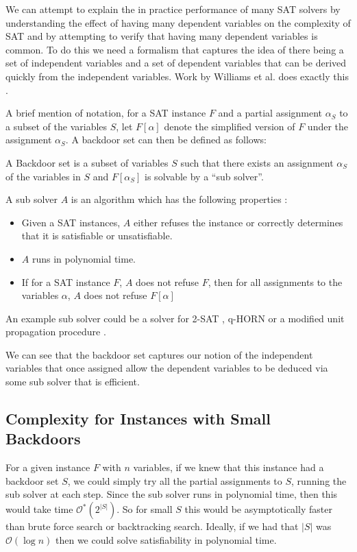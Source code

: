 We can attempt to explain the in practice performance of many SAT solvers
by understanding the effect of having many dependent variables on the complexity
of SAT and by attempting to verify that having many dependent variables is common.
To do this we need a formalism that captures the idea of there being a set
of independent variables and a set of dependent variables that can be derived quickly
from the independent variables.
Work by Williams et al. does exactly this \cite{backdoor_typical}.

A brief mention of notation, for a SAT instance $F$ and a partial assignment $\alpha_S$
to a subset of the variables $S$, let $F[\alpha]$ denote the simplified version of $F$
under the assignment $\alpha_S$.
A backdoor set can then be defined as follows:
\begin{definition}
    A Backdoor set is a subset of variables $S$ such that there
    exists an assignment $\alpha_S$ of the variables in $S$ and $F[\alpha_S]$
    is solvable by a ``sub solver''. \cite{backdoor_typical}
\end{definition}
\begin{definition}
    A sub solver $A$ is an algorithm which has the following properties \cite{backdoor_typical}:
    \begin{itemize}
        \item Given a SAT instances, $A$ either refuses the instance or
        correctly determines that it is satisfiable or unsatisfiable.
        \item $A$ runs in polynomial time.
        \item If for a SAT instance $F$, $A$ does not refuse $F$, then for all
        assignments to the variables $\alpha$, $A$ does not refuse $F[\alpha]$
    \end{itemize}
\end{definition}
An example sub solver could be a solver for 2-SAT \cite{aspvall1979linear},
q-HORN \cite{boros1994recognition} or a modified unit propagation procedure
\cite{davis1960computing}.

We can see that the backdoor set captures our notion of the independent variables
that once assigned allow the dependent variables to be deduced via some sub solver
that is efficient.

\subsection{Complexity for Instances with Small Backdoors}
For a given instance $F$ with $n$ variables, if we knew that
this instance had a backdoor set $S$, we could simply try all the 
partial assignments to $S$, running the sub solver at each step. Since
the sub solver runs in polynomial time, then this would take time 
$\mathcal{O}^{\ast}(2^{|S|})$. So for small $S$ this would be asymptotically faster
than brute force search or backtracking search. Ideally, if we had that
$|S|$ was $\mathcal{O}(\log n)$ then we could solve satisfiability in
polynomial time.

